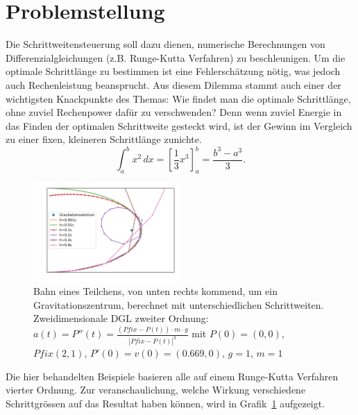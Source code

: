 %
%
%
\section{Problemstellung
\label{steps:section:problemstellung}}
Die Schrittweitensteuerung soll dazu dienen, numerische Berechnungen von Differenzialgleichungen (z.B. Runge-Kutta Verfahren) zu beschleunigen.
Um die optimale Schrittlänge zu bestimmen ist eine Fehlerschätzung nötig,
was jedoch auch Rechenleistung beansprucht.
Aus diesem Dilemma stammt auch einer der wichtigsten Knackpunkte des Themas:
Wie findet man die optimale Schrittlänge, ohne zuviel Rechenpower dafür zu verschwenden?
Denn wenn zuviel Energie in das Finden der optimalen Schrittweite gesteckt wird,
ist der Gewinn im Vergleich zu einer fixen, kleineren Schrittlänge zunichte.
\begin{equation}
\int_a^b x^2\, dx
=
\left[ \frac13 x^3 \right]_a^b
=
\frac{b^3-a^3}3.
\label{steps:equation1}
\end{equation}
\begin{figure}
\centering
\includegraphics[width=0.5\textwidth]{papers/steps/img/gravity_different_fixed_stepsize.pdf}
\caption{Bahn eines Teilchens, von unten rechts kommend,
um ein Gravitationszentrum, berechnet mit unterschiedlichen Schrittweiten.
Zweidimensionale DGL zweiter Ordnung:
$a(t)=P''(t)=\frac{(Pfix-P(t))\cdot m\cdot g}{|Pfix-P(t)|^{3}}$
mit $P(0)=(0, 0)$, $Pfix(2, 1)$, $P'(0)=v(0)=(0.669, 0)$, $g=1$, $m=1$
\label{buch:steps:fixed_comparison}}
\end{figure}
Die hier behandelten Beispiele basieren alle auf einem Runge-Kutta Verfahren
vierter Ordnung. Zur veranschaulichung, welche Wirkung verschiedene Schrittgrössen
auf das Resultat haben können, wird in Grafik~\ref{buch:steps:fixed_comparison} aufgezeigt.





